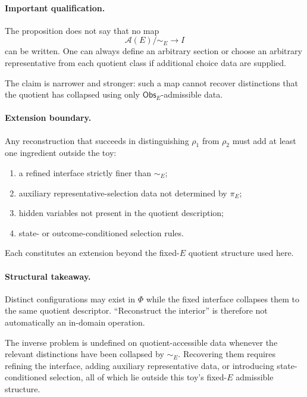 \documentclass[aps,prx,onecolumn,11pt]{revtex4-2}
\theoremstyle{plain}
\theoremstyle{definition}
\theoremstyle{remark}
\begin{document}
\paragraph{Important qualification.}

The proposition does not say that no map
\[
\mathcal A(E)/{\sim_E}\to I
\]
can be written. One can always define an arbitrary section or choose an
arbitrary representative from each quotient class if additional choice
data are supplied.

The claim is narrower and stronger: such a map cannot recover
distinctions that the quotient has collapsed using only
\(\mathsf{Obs}_E\)-admissible data.

\paragraph{Extension boundary.}

Any reconstruction that succeeds in distinguishing \(\rho_1\) from
\(\rho_2\) must add at least one ingredient outside the toy:

\begin{enumerate}[label=(\alph*), leftmargin=2.2em]
\item a refined interface strictly finer than \(\sim_E\);
\item auxiliary representative-selection data not determined by
\(\pi_E\);
\item hidden variables not present in the quotient description;
\item state- or outcome-conditioned selection rules.
\end{enumerate}

Each constitutes an extension beyond the fixed-\(E\) quotient structure
used here.

\paragraph{Structural takeaway.}

Distinct configurations may exist in \(\Phi\) while the fixed interface
collapses them to the same quotient descriptor. ``Reconstruct the
interior'' is therefore not automatically an in-domain operation.

The inverse problem is undefined on quotient-accessible data whenever
the relevant distinctions have been collapsed by \(\sim_E\). Recovering
them requires refining the interface, adding auxiliary representative
data, or introducing state-conditioned selection, all of which lie
outside this toy's fixed-\(E\) admissible structure.
\end{document}
